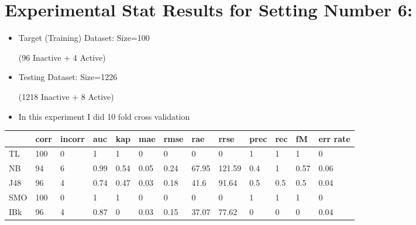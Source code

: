 \documentclass[a4paper,12pt, english]{article}
\begin{document}
\section{Experimental Stat Results for Setting Number 6:}
\begin{itemize}
\item Target (Training) Dataset: Size=100 \begin{scriptsize}(96 Inactive + 4 Active)\end{scriptsize} 
\item Testing Dataset: Size=1226 \begin{scriptsize}(1218 Inactive + 8 Active)\end{scriptsize}
\item In this experiment I did 10 fold cross validation
\end{itemize}  
\begin{small}
\begin{center}
    \begin{tabular}{ | l | l | l | l | l | l | l | l | l | l | l | l | l |}
    \hline
      	& corr & incorr  & auc & kap & mae & rmse & rae & rrse & prec & rec & fM & err rate\\ \hline
      	TL & 100 & 0 & 1 & 1 & 0 & 0 & 0 & 0 & 1 & 1 & 1 & 0\\ \hline
	NB & 94 & 6 & 0.99 & 0.54 & 0.05 & 0.24 & 67.95 & 121.59 & 0.4 & 1 & 0.57 & 0.06\\ \hline
	J48 & 96 & 4 & 0.74 & 0.47 & 0.03 & 0.18 & 41.6 & 91.64 & 0.5 & 0.5 & 0.5 & 0.04\\ \hline
	SMO & 100 & 0 & 1 & 1 & 0 & 0 & 0 & 0 & 1 & 1 & 1 & 0\\ \hline
	IBk & 96 & 4 & 0.87 & 0 & 0.03 & 0.15 & 37.07 & 77.62 & 0 & 0 & 0 & 0.04\\ \hline  
    \end{tabular}       
\end{center}
\end{small}
\end{document}
